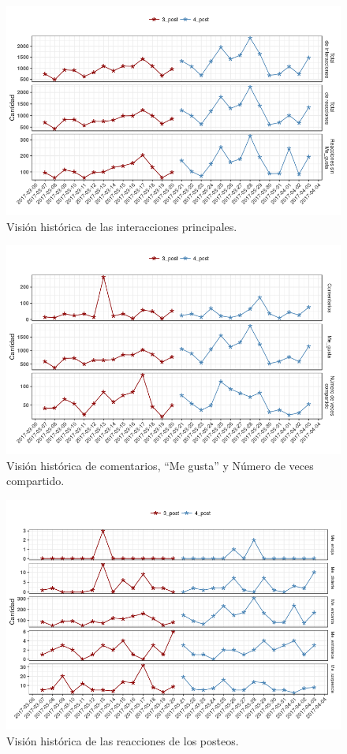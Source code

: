 \documentclass[a4paper,10pt]{article}
\begin{document}
\begin{figure}[H]
  \begin{center}
   \includegraphics[width=.75\textwidth]{imagenes/graficas/historico1.png}
   \caption{Visión histórica de las interacciones principales.}
  \end{center} 
\end{figure}


\begin{figure}[H]
  \begin{center}
   \includegraphics[width=.75\textwidth]{imagenes/graficas/historico2.png}
   \caption{Visión histórica de comentarios, ``Me gusta'' y Número de veces compartido.}
  \end{center}
\end{figure}

\begin{figure}[H]
  \begin{center}
   \includegraphics[width=.75\textwidth]{imagenes/graficas/historico3.png}
   \caption{Visión histórica de las reacciones de los posteos.}
  \end{center}
\end{figure}
\end{document}
